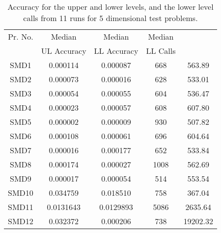 \documentclass[twoside]{article}
\begin{document}
\begin{table*}[hbt]
\caption{Accuracy for the upper and lower levels, and the lower level calls from 11
  runs for 5 dimensional test problems.} 
\label{tab:table1b}
\begin{center}
\begin{tabular}{|c|c|c|c|c|} \hline
Pr. No. & Median & Median & Median &  \\ \cline{2-4}
	& UL Accuracy & LL Accuracy & LL Calls &   \\ \hline
SMD1 & 0.000114 & 0.000087 & 668 & 563.89 	\\	\hline
SMD2 & 0.000073 & 0.000016 & 628 & 533.01 	\\	\hline
SMD3 & 0.000054 & 0.000055 & 604 & 536.47 	\\	\hline
SMD4 & 0.000023 & 0.000057 & 608 & 607.80 	\\	\hline
SMD5 & 0.000002 & 0.000009 & 930 & 507.82 	\\	\hline
SMD6 & 0.000108 & 0.000061 & 696 & 604.64 	\\	\hline
SMD7 & 0.000016 & 0.000177 & 652 & 533.84 	\\	\hline
SMD8 & 0.000174 & 0.000027 & 1008 & 562.69 	\\	\hline
SMD9 & 0.000017 & 0.000054 & 514 & 553.54 	\\	\hline
SMD10 & 0.034759 & 0.018510 & 758 & 367.04 	\\	\hline
SMD11 & 0.0131643 & 0.0129893 & 5086 & 2635.64 \\	\hline
SMD12 & 0.032372 & 0.000206 & 738 & 19202.32 \\	\hline
\end{tabular}
\end{center}
\end{table*}
\end{document}
